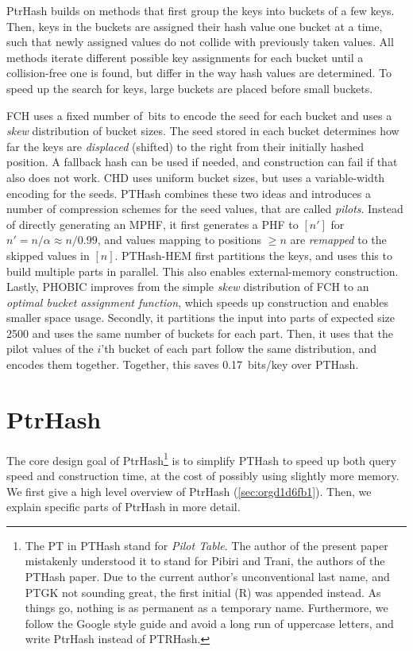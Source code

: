 \documentclass[a4paper,UKenglish,cleveref,thm-restate]{lipics-v2021}
\begin{document}
PtrHash builds on methods that first group the keys into
buckets of a few keys. Then, keys in the buckets are assigned their hash value
one bucket at a time, such that newly assigned values do not collide with
previously taken values. All methods iterate different possible key assignments
for each bucket until a collision-free one is found, but differ in the way
hash values are determined. To speed up the search for keys, large buckets are
placed before small buckets.

FCH \cite{fch} uses a fixed number of~bits to encode the seed for each bucket and
uses a \emph{skew} distribution of bucket sizes. The seed stored in each bucket
determines how far the keys are \emph{displaced} (shifted) to the right from their
initially hashed position. A fallback hash can be used if needed, and
construction can fail if that also does not work. CHD \cite{chd} uses uniform
bucket sizes, but uses a variable-width encoding for the seeds.
PTHash \cite{pthash} combines these two ideas and introduces a number of
compression schemes for the seed values, that are called \emph{pilots}. Instead of
directly generating an MPHF, it first generates a PHF to \([n']\) for
\(n'=n/\alpha \approx n/0.99\), and values mapping to positions \(\geq n\) are \emph{remapped} to
the skipped values in \([n]\). PTHash-HEM \cite{pthash-2} first partitions the keys, and uses this
to build multiple parts in parallel. This also enables external-memory construction.
Lastly, PHOBIC \cite{phobic} improves from the simple \emph{skew} distribution of
FCH to an \emph{optimal bucket assignment function}, which speeds up construction and
enables smaller space usage. Secondly, it partitions the input into parts of
expected size
2500 and uses the same number of buckets for each part. Then, it uses that the
pilot values of the \(i\)'th bucket of each part follow the same distribution, and
encodes them together. Together, this saves 0.17~bits/key over PTHash.
\section{PtrHash}
\label{sec:orge8f771f}

The core design goal of PtrHash\footnote{The
PT in PTHash stand for \emph{Pilot Table}. The
author of the present paper mistakenly understood it to stand for Pibiri and
Trani, the authors of the PTHash paper. Due to the current author's
unconventional last name, and PTGK not sounding great, the first initial (R) was
appended instead. As things go, nothing is as permanent as a temporary name.
Furthermore, we follow the Google style guide and avoid a long run of uppercase
letters, and write PtrHash instead of PTRHash.}
is to simplify PTHash to speed up both query speed
and construction time, at the cost of possibly using slightly more memory.
We first give a high level overview of PtrHash (\cref{sec:orgd1d6fb1}). Then, we explain
specific parts of PtrHash in more detail.
\end{document}
